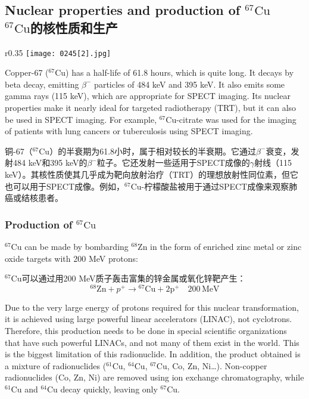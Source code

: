 \documentclass[dvipsnames, svgnames,a4paper,11pt]{article}
\begin{document}
\subsection{Nuclear properties and production of \(\mathrm{^{67}Cu}\)\\ \(\mathrm{^{67}Cu}\)的核性质和生产}  

\begin{wrapfigure}{r}{0.35\textwidth}
    \centering
    \texttt{[image: 0245[2].jpg]}
     \label{fig328}
\end{wrapfigure}

Copper-67 (\(\mathrm{^{67}Cu}\)) has a half-life of 61.8 hours, which is quite long. It decays by beta decay, emitting \(\beta^-\) particles of 484 keV and 395 keV. It also emits some gamma rays (115 keV), which are appropriate for SPECT imaging. Its nuclear properties make it nearly ideal for targeted radiotherapy (TRT), but it can also be used in SPECT imaging. For example, \(\mathrm{^{67}Cu}\)-citrate was used for the imaging of patients with lung cancers or tuberculosis using SPECT imaging.

铜-67（\(\mathrm{^{67}Cu}\)）的半衰期为61.8小时，属于相对较长的半衰期。它通过\(\beta^-\)衰变，发射484 keV和395 keV的\(\beta^-\)粒子。它还发射一些适用于SPECT成像的$\gamma$射线（115 keV）。其核性质使其几乎成为靶向放射治疗（TRT）的理想放射性同位素，但它也可以用于SPECT成像。例如，\(\mathrm{^{67}Cu}\)-柠檬酸盐被用于通过SPECT成像来观察肺癌或结核患者。

\subsubsection{Production of \(\mathrm{^{67}Cu}\)}  
\(\mathrm{^{67}Cu}\) can be made by bombarding \(\mathrm{^{68}Zn}\) in the form of enriched zinc metal or zinc oxide targets with 200 MeV protons:

\(\mathrm{^{67}Cu}\)可以通过用200 MeV质子轰击富集的锌金属或氧化锌靶产生：
\[
\mathrm{^{68}Zn} + p^+ \rightarrow \mathrm{^{67}Cu+ 2p^+ \quad 200 \, MeV} 
\]

Due to the very large energy of protons required for this nuclear transformation, it is achieved using large powerful linear accelerators (LINAC), not cyclotrons. Therefore, this production needs to be done in special scientific organizations that have such powerful LINACs, and not many of them exist in the world. This is the biggest limitation of this radionuclide. In addition, the product obtained is a mixture of radionuclides (\(\mathrm{^{61}Cu}\), \(\mathrm{^{64}Cu}\), \(\mathrm{^{67}Cu}\), Co, Zn, Ni…). Non-copper radionuclides (Co, Zn, Ni) are removed using ion exchange chromatography, while \(\mathrm{^{61}Cu}\) and \(\mathrm{^{64}Cu}\) decay quickly, leaving only \(\mathrm{^{67}Cu}\).
\end{document}
